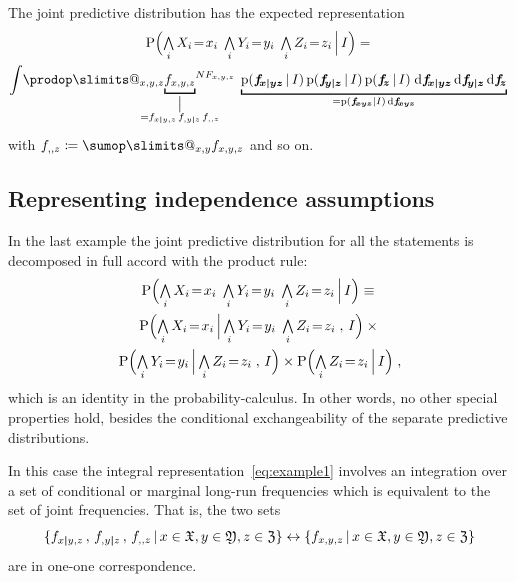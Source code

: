 \documentclass[\ifafour a4paper,12pt,\else a5paper,10pt,\fi%
onecolumn,oneside,article,%
british%
]{memoir}
\makeatletter
\theoremstyle{remark}
\theoremstyle{innote}
\def\sum{\DOTSI\sumop\slimits@}
\def\prod{\DOTSI\prodop\slimits@}
\newcommand*{\di}{\mathrm{d}}%
\newcommand*{\defd}{\coloneqq}
\newcommand*{\Land}{\mathop{\textstyle\bigwedge}}
\DeclarePairedDelimiter\set{\{}{\}}
\newcommand*{\pf}{\mathrm{p}}%
\newcommand*{\p}{\mathrm{P}}%
\renewcommand*{\|}[1][]{\nonscript\,#1\vert\nonscript\,\mathopen{}}
\renewcommand*{\=}{\TextOrMath\texteq\eq}
\newcommand*{\X}[1]{X_{#1}}
\newcommand*{\x}[1]{x_{#1}}
\newcommand*{\A}[1]{A_{#1}}
\newcommand*{\B}[1]{B_{#1}}
\newcommand*{\Y}[1]{Y_{#1}}
\newcommand*{\y}[1]{y_{#1}}
\newcommand*{\Z}[1]{Z_{#1}}
\newcommand*{\z}[1]{z_{#1}}
\newcommand*{\sx}{\mathfrak{X}}
\newcommand*{\sy}{\mathfrak{Y}}
\newcommand*{\sz}{\mathfrak{Z}}
\newcommand*{\ff}[1]{f_{#1}}
\newcommand*{\ffb}[1]{\bm{f_{\!#1}}}
\newcommand*{\FF}[1]{F_{#1}}
\newcommand*{\bcond}[1][]{\nonscript\,#1\bm{\vert}\nonscript\;\mathopen{}}
\makeatother
\begin{document}
The joint predictive distribution has the expected representation
\begin{multline}
  \label{eq:example1}
  \p\Bigl( \Land_{i}\X{i}\=\x{i} \;
  \Land_{i}\Y{i}\=\y{i} \;  \Land_{i}\Z{i}\=\z{i} \|[\Big] I\Bigr)
  ={}\\
\int\!\prod_{x,y,z} {\underbracket[1pt]{\ff{x,y,z}}_{\mathclap{%
\begin{gathered}
\scriptstyle\big\vert\\[-2\jot]     
\scriptstyle {}=\ff{x \bcond y,z}\, \ff{,y \bcond z}\, \ff{,,z}
\end{gathered}%
}}}^{N \FF{x,y,z}}\;
\underbracket[1pt]{\pf(\ffb{x \bcond y z}\|I)\,\pf(\ffb{y \bcond z}\|I)\,\pf(\ffb{z}\|I)
  \;\di\ffb{x \bcond y z} \,\di\ffb{y \bcond z} \,\di\ffb{z}}_{ {}=
\pf(\ffb{x y z}\|I)\,\di\ffb{x y z}} \;
\end{multline}
with $\ff{,,z} \defd \sum_{x,y}\ff{x,y,z}$ and so on.

\subsection{Representing independence assumptions}
\label{sec:graph_repr_indep}

In the last example the joint predictive distribution for all the
statements is decomposed in full accord with the product rule:
\begin{multline}
  \label{eq:example_usual_factorization}
  \p\Bigl( \Land_{i}\X{i}\=\x{i} \;  \Land_{i}\Y{i}\=\y{i} \;
  \Land_{i}\Z{i}\=\z{i} \|[\Big] I\Bigr)  \equiv{}\\
  \p\Bigl( \Land_{i}\X{i}\=\x{i} \|[\Big]  \Land_{i}\Y{i}\=\y{i} \;
  \Land_{i}\Z{i}\=\z{i}\;,\,  I\Bigr) \times{}\\
  \p\Bigl( \Land_{i}\Y{i}\=\y{i} \|[\Big]
  \Land_{i}\Z{i}\=\z{i}\;,\, I\Bigr) \times
  \p\Bigl( \Land_{i}\Z{i}\=\z{i} \|[\Big]  I\Bigr)
  \;,
\end{multline}
which is an identity in the probability-calculus. In other words, no other
special properties hold, besides the conditional exchangeability of the
separate predictive distributions.

In this case the integral representation~\eqref{eq:example1} involves an
integration over a set of conditional or marginal long-run frequencies
which is equivalent to the set of joint frequencies. That is, the two sets
\begin{equation}
  \label{eq:sets_corr}
  \set{\ff{x \bcond y,z} \,,\, \ff{,y \bcond z} \,,\, \ff{,,z} \|
 x \in \sx, y \in \sy, z \in \sz}
\leftrightarrow
\set{\ff{x,y,z} \| x \in \sx, y \in \sy, z \in \sz}
\end{equation}
are in one-one correspondence.
\end{document}
